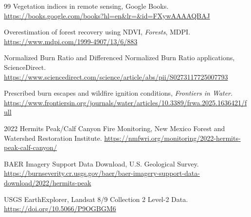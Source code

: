 \documentclass[11pt]{article}
\begin{document}
\begin{thebibliography}{99}
Vegetation indices in remote sensing, Google Books. \url{https://books.google.com/books?hl=en&lr=&id=FXywAAAAQBAJ}

Overestimation of forest recovery using NDVI, \textit{Forests}, MDPI. \url{https://www.mdpi.com/1999-4907/13/6/883}

Normalized Burn Ratio and Differenced Normalized Burn Ratio applications, ScienceDirect. \url{https://www.sciencedirect.com/science/article/abs/pii/S0273117725007793}

Prescribed burn escapes and wildfire ignition conditions, \textit{Frontiers in Water}. \url{https://www.frontiersin.org/journals/water/articles/10.3389/frwa.2025.1636421/full}

2022 Hermits Peak/Calf Canyon Fire Monitoring, New Mexico Forest and Watershed Restoration Institute. \url{https://nmfwri.org/monitoring/2022-hermits-peak-calf-canyon/}

BAER Imagery Support Data Download, U.S. Geological Survey. \url{https://burnseverity.cr.usgs.gov/baer/baer-imagery-support-data-download/2022/hermits-peak}

USGS EarthExplorer, Landsat 8/9 Collection 2 Level-2 Data. \url{https://doi.org/10.5066/P9OGBGM6}

\end{thebibliography}
\end{document}
